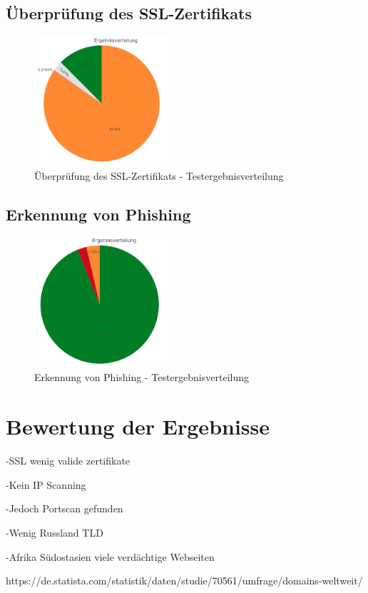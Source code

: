 \subsection{Überprüfung des SSL-Zertifikats}
\begin{figure}[H]
  \centering
  \includegraphics[width=5cm]{images/stats/diacertificate}
  \caption{Überprüfung des SSL-Zertifikats - Testergebnisverteilung}
  \label{fig:diacertificate}
\end{figure}

\subsection{Erkennung von Phishing}
\begin{figure}[H]
  \centering
  \includegraphics[width=5cm]{images/stats/diaphishing}
  \caption{Erkennung von Phishing - Testergebnisverteilung}
  \label{fig:diaphishing}
\end{figure}

\section{Bewertung der Ergebnisse}

-SSL wenig valide zertifikate

-Kein IP Scanning

-Jedoch Portscan gefunden

-Wenig Russland TLD

-Afrika Südostasien viele verdächtige Webseiten

https://de.statista.com/statistik/daten/studie/70561/umfrage/domains-weltweit/
